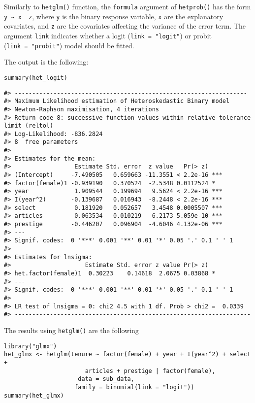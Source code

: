 Similarly to \texttt{hetglm()} function, the \texttt{formula} argument of \texttt{hetprob()} has the form \texttt{y\ \textasciitilde{}\ x\ \textbar{}\ z}, where \texttt{y} is the binary response variable, \texttt{x} are the explanatory covariates, and \texttt{z} are the covariates affecting the variance of the error term. The argument \texttt{link} indicates whether a logit (\texttt{link\ =\ "logit"}) or probit (\texttt{link\ =\ "probit"}) model should be fitted.

The output is the following:

\begin{verbatim}
summary(het_logit)
\end{verbatim}

\begin{verbatim}
#> ------------------------------------------------------------------
#> Maximum Likelihood estimation of Heteroskedastic Binary model 
#> Newton-Raphson maximisation, 4 iterations
#> Return code 8: successive function values within relative tolerance limit (reltol)
#> Log-Likelihood: -836.2824 
#> 8  free parameters
#> 
#> Estimates for the mean:
#>                  Estimate Std. error  z value   Pr(> z)    
#> (Intercept)     -7.490505   0.659663 -11.3551 < 2.2e-16 ***
#> factor(female)1 -0.939190   0.370524  -2.5348 0.0112524 *  
#> year             1.909544   0.199694   9.5624 < 2.2e-16 ***
#> I(year^2)       -0.139687   0.016943  -8.2448 < 2.2e-16 ***
#> select           0.181920   0.052657   3.4548 0.0005507 ***
#> articles         0.063534   0.010219   6.2173 5.059e-10 ***
#> prestige        -0.446207   0.096904  -4.6046 4.132e-06 ***
#> ---
#> Signif. codes:  0 '***' 0.001 '**' 0.01 '*' 0.05 '.' 0.1 ' ' 1
#> 
#> Estimates for lnsigma:
#>                     Estimate Std. error z value Pr(> z)  
#> het.factor(female)1  0.30223    0.14618  2.0675 0.03868 *
#> ---
#> Signif. codes:  0 '***' 0.001 '**' 0.01 '*' 0.05 '.' 0.1 ' ' 1
#> 
#> LR test of lnsigma = 0: chi2 4.5 with 1 df. Prob > chi2 =  0.0339 
#> -------------------------------------------------------------------
\end{verbatim}

The results using \texttt{hetglm()} are the following

\begin{verbatim}
library("glmx")
het_glmx <- hetglm(tenure ~ factor(female) + year + I(year^2) + select +  
                       articles + prestige | factor(female), 
                     data = sub_data, 
                    family = binomial(link = "logit"))
summary(het_glmx)
\end{verbatim}

